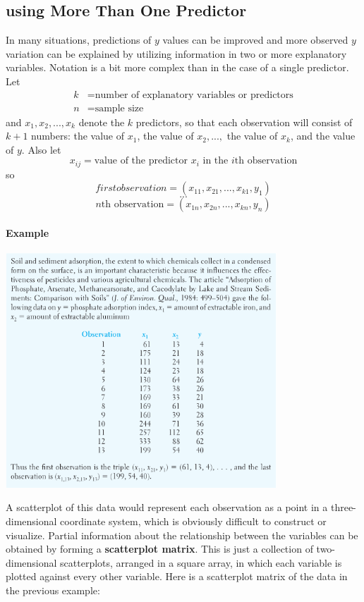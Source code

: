 \documentclass{article}
\newcommand{\p}[1]{\paragraph{#1}} %
\begin{document}
	\subsection{using More Than One Predictor} %
	
	In many situations, predictions of $y$ values can be improved and more observed $y$ variation 
	can be explained by utilizing information in two or more explanatory variables. Notation is a bit 
	more complex than in the case of a single predictor. Let
	\begin{align}
		k &= \text{number of explanatory variables or predictors} \\
		n &= \text{sample size}
	\end{align}
	and $x_1,x_2,...,x_k$ denote the $k$ predictors, so that each observation will consist of $k+1$ 
	numbers: the value of $x_1$, the value of $x_2,...,$ the value of $x_k$, and the value of $y$. 
	Also let
	\[ x_{ij} = \text{value of the predictor $x_i$ in the $i$th observation} \]
	so
	\[ first observation = (x_{11},x_{21},...,x_{k1},y_1) \]
	\[ ... \]
	\[ \text{$n$th observation} = (x_{1n},x_{2n},...,x_{kn},y_n) \]
	
	\p{Example}
	\begin{center}
		\includegraphics[width=4in]{example_315.jpg}
	\end{center}
	
	A scatterplot of this data would represent each observation as a point in a three-dimensional 
	coordinate system, which is obviously difficult to construct or visualize. Partial information about 
	the relationship between the variables can be obtained by forming a \textbf{scatterplot matrix}. 
	This is just a collection of two-dimensional scatterplots, arranged in a square array, in which 
	each variable is plotted against every other variable. Here is a scatterplot matrix of the data in 
	the previous example: 
	
\end{document}
